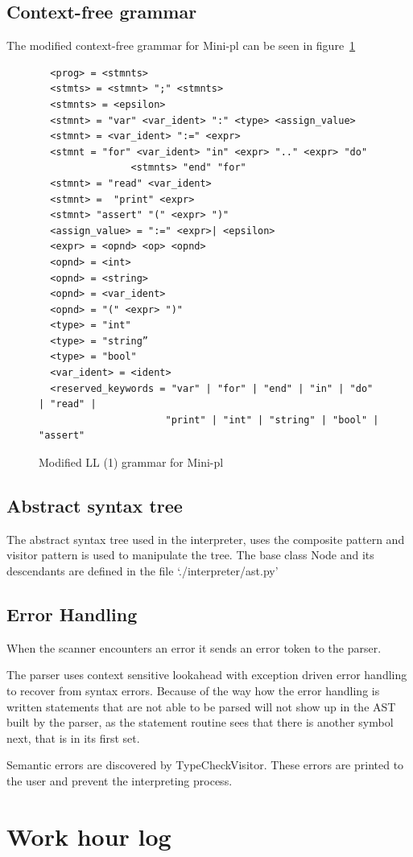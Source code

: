 \documentclass[12pt,a4paper]{article}
\begin{document}
\subsection{Context-free grammar}
The modified context-free grammar for Mini-pl can be seen in figure~\ref{cfg}
\begin{figure}\label{cfg}
  \caption{Modified LL (1) grammar for Mini-pl}
  \begin{verbatim}
  <prog> = <stmnts>
  <stmts> = <stmnt> ";" <stmnts>
  <stmnts> = <epsilon>
  <stmnt> = "var" <var_ident> ":" <type> <assign_value>
  <stmnt> = <var_ident> ":=" <expr>
  <stmnt = "for" <var_ident> "in" <expr> ".." <expr> "do"
                <stmnts> "end" "for"
  <stmnt> = "read" <var_ident> 
  <stmnt> =  "print" <expr>
  <stmnt> "assert" "(" <expr> ")"
  <assign_value> = ":=" <expr>| <epsilon>
  <expr> = <opnd> <op> <opnd>
  <opnd> = <int>
  <opnd> = <string>
  <opnd> = <var_ident>
  <opnd> = "(" <expr> ")"
  <type> = "int"
  <type> = "string”
  <type> = "bool"
  <var_ident> = <ident>
  <reserved_keywords = "var" | "for" | "end" | "in" | "do" | "read" |
                      "print" | "int" | "string" | "bool" | "assert"
  \end{verbatim}
\end{figure}

\subsection{Abstract syntax tree}
The abstract syntax tree used in the interpreter, uses the composite pattern and visitor
pattern is used to manipulate the tree. The base class Node and its descendants are
defined in the file `./interpreter/ast.py'

\subsection{Error Handling}

When the scanner encounters an error it sends an error token to the parser.

The parser uses context sensitive lookahead with exception driven error
handling to recover from syntax errors. Because of the way how the error
handling is written statements that are not able to be parsed will not show up
in the AST built by the parser, as the statement routine sees that there is
another symbol next, that is in its first set.

Semantic errors are discovered by TypeCheckVisitor.
These errors are printed to the user and prevent the interpreting process.

\section{Work hour log}
\end{document}
